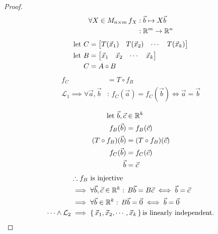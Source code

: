\begin{proof}

	\begin{align*}
		\forall X \in M_{n \times m}\, f_X & : \vec b \mapsto X \vec b \\
		                                   & : {\mathbb R}^{m} \to {\mathbb R}^n
	\end{align*}
	\begin{align*}
		{\text{let } } C & = { \begin{bmatrix}  T(\vec x_1) & T(\vec x_2) & \cdots & T(\vec x_k)  \end{bmatrix} } \\
		{\text{let } } B & = { \begin{bmatrix}  \vec x_1    & \vec x_2    & \cdots & \vec x_k  \end{bmatrix} }    \\
		C       & = A \circ B
	\end{align*}
	\begin{align*}
		f_C                                             & = T \circ f_B                                     \\
		\mathcal L_{1} \implies		\forall \vec a, \vec b & :\, f_C(\vec a) = f_C(\vec b) \iff  \vec a=\vec b
	\end{align*}

	\begin{align*}
		{\text{let } } \vec b, \vec c   & \in {\mathbb R}^{k}              \\
		f_B (\vec b)           & = f_B(\vec c)           \\
		(T \circ	f_B) (\vec b) & = (T \circ f_B)(\vec c) \\
		f_C (\vec b)           & = f_C(\vec c)           \\
		\vec b                 & = \vec c
	\end{align*}
	\begin{align*}
		                          & \therefore                 f_B \text{ is injective}                                   \\
		                          & \implies \forall \vec b, \vec c \in {\mathbb R}^{k} :\, B\vec b = B\vec c \iff \vec b = \vec c \\
		                          & \implies \forall \vec b \in {\mathbb R}^{k} :\, B\vec b = \vec 0 \iff \vec b = \vec 0          \\
		\dots \wedge	\mathcal L_2 & \implies \set{\vec x_1, \vec x_2 , \cdots , \vec x_k} \text{is linearly independent.}
	\end{align*}

\end{proof}
